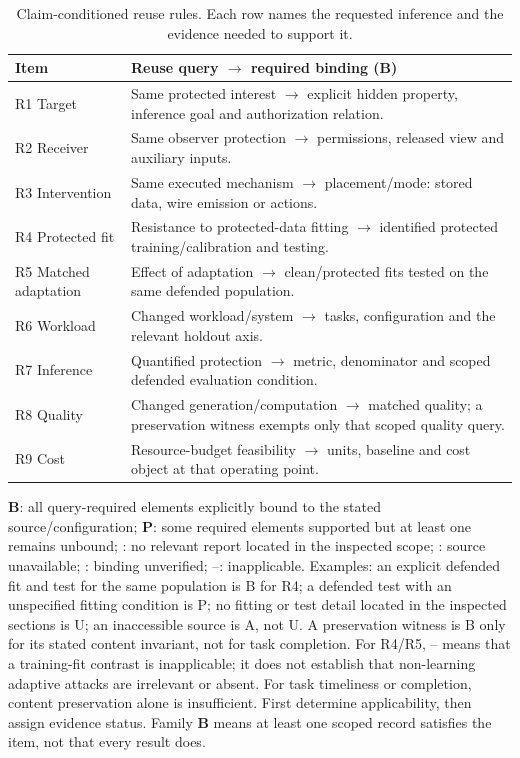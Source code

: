 \begin{table}[t]\centering\footnotesize
\caption{Claim-conditioned reuse rules. Each row names the requested inference and the evidence needed to support it.}\label{tab:audit-rules}
\begin{tabularx}{\columnwidth}{@{}p{}Y@{}}\toprule
Item & Reuse query $\rightarrow$ required binding (\textbf{B})\\\midrule
R1 Target & Same protected interest $\rightarrow$ explicit hidden property, inference goal and authorization relation.\\
R2 Receiver & Same observer protection $\rightarrow$ permissions, released view and auxiliary inputs.\\
R3 Intervention & Same executed mechanism $\rightarrow$ placement/mode: stored data, wire emission or actions.\\
R4 Protected fit & Resistance to protected-data fitting $\rightarrow$ identified protected training/calibration and testing.\\
R5 Matched adaptation & Effect of adaptation $\rightarrow$ clean/protected fits tested on the same defended population.\\
R6 Workload & Changed workload/system $\rightarrow$ tasks, configuration and the relevant holdout axis.\\
R7 Inference & Quantified protection $\rightarrow$ metric, denominator and scoped defended evaluation condition.\\
R8 Quality & Changed generation/computation $\rightarrow$ matched quality; a preservation witness exempts only that scoped quality query.\\
R9 Cost & Resource-budget feasibility $\rightarrow$ units, baseline and cost object at that operating point.\\\bottomrule
\end{tabularx}
\par\smallskip\raggedright\footnotesize \textbf{B}: all query-required elements explicitly bound to the stated source/configuration; \textbf{P}: some required elements supported but at least one remains unbound; \NRR{}: no relevant report located in the inspected scope; \NRA{}: source unavailable; \NRV{}: binding unverified; --: inapplicable. Examples: an explicit defended fit and test for the same population is B for R4; a defended test with an unspecified fitting condition is P; no fitting or test detail located in the inspected sections is U; an inaccessible source is A, not U. A preservation witness is B only for its stated content invariant, not for task completion. For R4/R5, -- means that a training-fit contrast is inapplicable; it does not establish that non-learning adaptive attacks are irrelevant or absent. For task timeliness or completion, content preservation alone is insufficient. First determine applicability, then assign evidence status. Family \textbf{B} means at least one scoped record satisfies the item, not that every result does.
\end{table}
